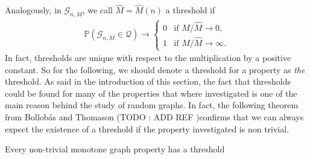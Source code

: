 Analogously, in $\mathcal{G}_{n, M}$, we call $\hat{M} = \hat{M}(n)$ a threshold if
\begin{align}
	\mathbb{P}(\mathcal{G}_{n,M} \in \mathcal{Q}) \rightarrow \left\{\begin{array}{rl}
										0 & \text{if } M / \hat{M} \to 0,\\
										1 & \text{if } M / \hat{M} \to \infty.
									 \end{array}
									\right.
\end{align}
In fact, thresholds are unique with respect to the multiplication by a positive constant. So for the following, we should denote a threshold for a property as \emph{the} threshold.
\newline
As said in the introduction of this section, the fact that thresholds could be found for many of the properties that where investigated is one of the main reason behind the study of random graphs.
In fact, the following theorem from Bollob\'as and Thomason (TODO : ADD REF )confirms that we can always expect the existence of a threshold if the property investigated is non trivial.
\begin{theorem}
	Every non-trivial monotone graph property has a threshold
\end{theorem}
